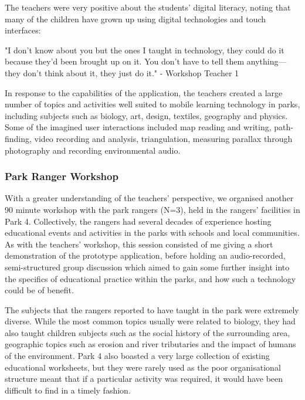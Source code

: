 The teachers were very positive about the students' digital literacy, noting that many of the children have grown up using digital technologies and touch interfaces:

\begin{displayquote}
"I don't know about you but the ones I taught in technology, they could do it because they'd been brought up on it. You don't have to tell them anything---they don't think about it, they just do it." - Workshop Teacher 1
\end{displayquote}

In response to the capabilities of the application, the teachers created a large number of topics and activities well suited to mobile learning technology in parks, including subjects such as biology, art, design, textiles, geography and physics. Some of the imagined user interactions included map reading and writing, path-finding, video recording and analysis, triangulation, measuring parallax through photography and recording environmental audio.

\subsubsection{Park Ranger Workshop}

With a greater understanding of the teachers’ perspective, we organised another 90 minute workshop with the park rangers (N=3), held in the rangers' facilities in Park 4. Collectively, the rangers had several decades of experience hosting educational events and activities in the parks with schools and local communities. As with the teachers' workshop, this session consisted of me giving a short demonstration of the prototype application, before holding an audio-recorded, semi-structured group discussion which aimed to gain some further insight into the specifics of educational practice within the parks, and how such a technology could be of benefit. 

The subjects that the rangers reported to have taught in the park were extremely diverse. While the most common topics usually were related to biology, they had also taught children subjects such as the social history of the surrounding area, geographic topics such as erosion and river tributaries and the impact of humans of the environment. Park 4 also boasted a very large collection of existing educational worksheets, but they were rarely used as the poor organisational structure meant that if a particular activity was required, it would have been difficult to find in a timely fashion.


